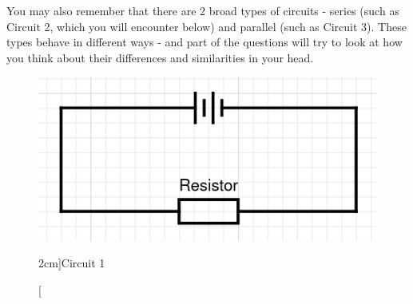 \documentclass[a4paper,openany,nobib]{tufte-book}
\begin{document}
You may also remember that there are 2 broad types of circuits - series (such as Circuit 2, which you will encounter below) and parallel (such as Circuit 3). These types behave in different ways - and part of the questions will try to look at how you think about their differences and similarities in your head.
\newpage
{}
\begin{figure}[h!]
	\center
	\includegraphics[width=\linewidth]{simple}
	\caption[][2cm]{Circuit 1}
	\label{fig:marginfig}
\end{figure}
\end{document}
